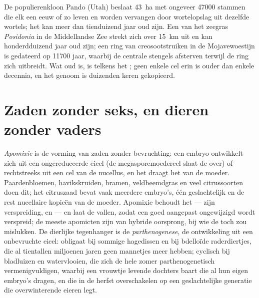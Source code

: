 \begin{example}\label{ex:b2:asexual-reproduction:oldest}
De populierenkloon Pando (Utah) beslaat \qty{43}{ha} met ongeveer
\num{47000} stammen die elk een eeuw of zo leven en worden vervangen door
wortelopslag uit dezelfde wortels; het  kan meer dan tienduizend jaar
oud zijn. Een  van het zeegras \emph{Posidonia} in de Middellandse
Zee strekt zich over \qty{15}{km} uit en kan honderdduizend jaar oud zijn;
een ring van creosootstruiken in de Mojavewoestijn is gedateerd op
\num{11700} jaar, waarbij de centrale stengels afsterven terwijl de ring
zich uitbreidt. Wat oud is, is telkens het ; geen enkele cel erin is
ouder dan enkele decennia, en het genoom is duizenden keren gekopieerd.
\end{example}

\section{Zaden zonder seks, en dieren zonder vaders}

\begin{definition}[Apomixie]\label{def:b2:asexual-reproduction:apomixis}
\emph{Apomixie} is de vorming van zaden zonder bevruchting: een embryo
ontwikkelt zich uit een ongereduceerde eicel (de megasporemoedercel slaat
de  over) of rechtstreeks uit een cel van de nucellus, en het 
draagt het  van de moeder. Paardenbloemen, havikskruiden,
bramen, veldbeemdgras en veel citrussoorten doen dit; het citruszaad
bevat vaak meerdere embryo's, één geslachtelijk en de rest nucellaire
kopieën van de moeder. Apomixie behoudt het  --- zijn verspreiding,
 en  --- en laat de  vallen, zodat een goed
aangepast  ongewijzigd wordt verspreid; de meeste apomicten zijn
 van hybride oorsprong, bij wie de  toch zou mislukken.
De dierlijke tegenhanger is de \emph{parthenogenese}, de ontwikkeling uit
een onbevruchte eicel: obligaat bij sommige hagedissen en bij bdelloïde
raderdiertjes, die al tientallen miljoenen jaren geen mannetjes meer
hebben; cyclisch bij bladluizen en watervlooien, die zich de hele zomer
parthenogenetisch vermenigvuldigen, waarbij een vrouwtje levende dochters
baart die al hun eigen embryo's dragen, en die in de herfst overschakelen
op een geslachtelijke generatie die overwinterende eieren legt.
\end{definition}

